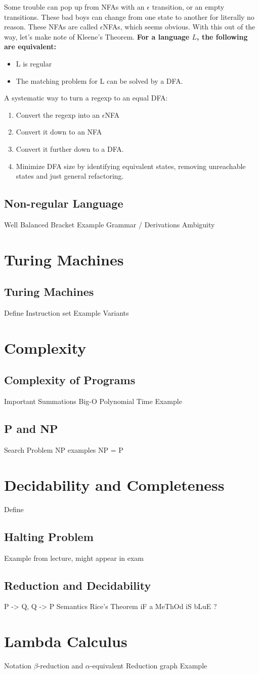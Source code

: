 Some trouble can pop up from NFAs with an $\epsilon$ transition, or an empty transitions. These bad boys can change from one state to another for literally no reason. These NFAs are called $\epsilon$NFAs, which seems obvious. With this out of the way, let's make note of Kleene's Theorem. \textbf{For a language $L$, the following are equivalent:}
\begin{itemize}
	\item L is regular
	\item The matching problem for L can be solved by a DFA.
\end{itemize}

A systematic way to turn a regexp to an equal DFA:
\begin{enumerate}
	\item Convert the regexp into an $\epsilon$NFA
	\item Convert it down to an NFA
	\item Convert it further down to a DFA.
	\item Minimize DFA size by identifying equivalent states, removing unreachable states and just general refactoring.
\end{enumerate}
\subsection{Non-regular Language}
Well Balanced Bracket Example
Grammar / Derivations
Ambiguity
\section{Turing Machines}
\subsection{Turing Machines}
Define
Instruction set
Example
Variants
\section{Complexity}
\subsection{Complexity of Programs}
Important Summations
Big-O
Polynomial Time
Example
\subsection{P and NP}
Search Problem
NP examples
NP = P
\section{Decidability and Completeness}
Define
\subsection{Halting Problem}
Example from lecture, might appear in exam
\subsection{Reduction and Decidability}
P -> Q, Q -> P
Semantics
Rice's Theorem
iF a MeThOd iS bLuE ?
\section{Lambda Calculus}
Notation
$\beta$-reduction and $\alpha$-equivalent
Reduction graph
Example